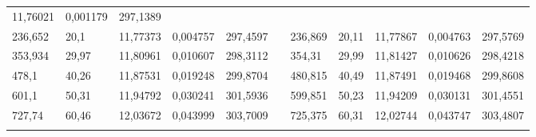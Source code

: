 \documentclass[12pt,a4paper]{article}
\begin{document}
\begin{enumerate}
{\begin{table}[p]
{\begin{tabular}{lllllllllll}
							\multicolumn{1}{l|}{11,76021} &
							\multicolumn{1}{l|}{0,001179} &
							\multicolumn{1}{l|}{297,1389} \\ \cline{1-5} \cline{7-11} 
							\multicolumn{1}{|l|}{236,652} &
							\multicolumn{1}{l|}{20,1} &
							\multicolumn{1}{l|}{11,77373} &
							\multicolumn{1}{l|}{0,004757} &
							\multicolumn{1}{l|}{297,4597} &
							\multicolumn{1}{l|}{} &
							\multicolumn{1}{l|}{236,869} &
							\multicolumn{1}{l|}{20,11} &
							\multicolumn{1}{l|}{11,77867} &
							\multicolumn{1}{l|}{0,004763} &
							\multicolumn{1}{l|}{297,5769} \\ \cline{1-5} \cline{7-11} 
							\multicolumn{1}{|l|}{353,934} &
							\multicolumn{1}{l|}{29,97} &
							\multicolumn{1}{l|}{11,80961} &
							\multicolumn{1}{l|}{0,010607} &
							\multicolumn{1}{l|}{298,3112} &
							\multicolumn{1}{l|}{} &
							\multicolumn{1}{l|}{354,31} &
							\multicolumn{1}{l|}{29,99} &
							\multicolumn{1}{l|}{11,81427} &
							\multicolumn{1}{l|}{0,010626} &
							\multicolumn{1}{l|}{298,4218} \\ \cline{1-5} \cline{7-11} 
							\multicolumn{1}{|l|}{478,1} &
							\multicolumn{1}{l|}{40,26} &
							\multicolumn{1}{l|}{11,87531} &
							\multicolumn{1}{l|}{0,019248} &
							\multicolumn{1}{l|}{299,8704} &
							\multicolumn{1}{l|}{} &
							\multicolumn{1}{l|}{480,815} &
							\multicolumn{1}{l|}{40,49} &
							\multicolumn{1}{l|}{11,87491} &
							\multicolumn{1}{l|}{0,019468} &
							\multicolumn{1}{l|}{299,8608} \\ \cline{1-5} \cline{7-11} 
							\multicolumn{1}{|l|}{601,1} &
							\multicolumn{1}{l|}{50,31} &
							\multicolumn{1}{l|}{11,94792} &
							\multicolumn{1}{l|}{0,030241} &
							\multicolumn{1}{l|}{301,5936} &
							\multicolumn{1}{l|}{} &
							\multicolumn{1}{l|}{599,851} &
							\multicolumn{1}{l|}{50,23} &
							\multicolumn{1}{l|}{11,94209} &
							\multicolumn{1}{l|}{0,030131} &
							\multicolumn{1}{l|}{301,4551} \\ \cline{1-5} \cline{7-11} 
							\multicolumn{1}{|l|}{727,74} &
							\multicolumn{1}{l|}{60,46} &
							\multicolumn{1}{l|}{12,03672} &
							\multicolumn{1}{l|}{0,043999} &
							\multicolumn{1}{l|}{303,7009} &
							\multicolumn{1}{l|}{} &
							\multicolumn{1}{l|}{725,375} &
							\multicolumn{1}{l|}{60,31} &
							\multicolumn{1}{l|}{12,02744} &
							\multicolumn{1}{l|}{0,043747} &
							\multicolumn{1}{l|}{303,4807} \\ \cline{1-5} \cline{7-11} 
							&
							&

\end{tabular}}
\end{table}}
\end{enumerate}
\end{document}
